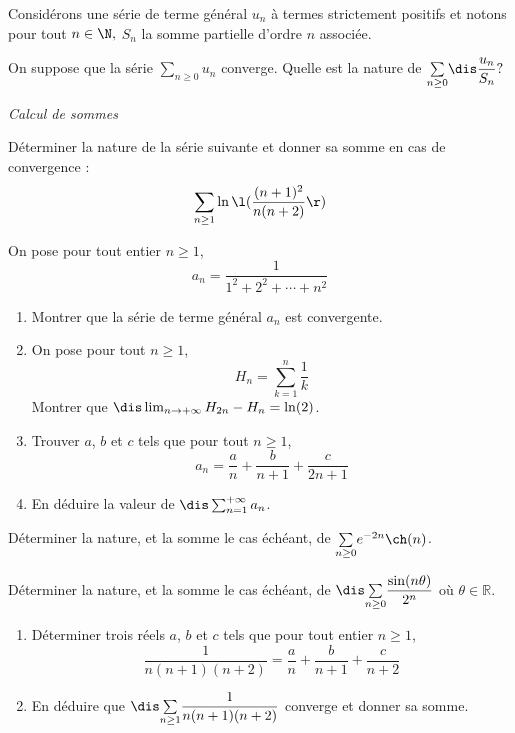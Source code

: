 \documentclass[a4paper,10pt]{report}
\newcommand{\Sum}[2]{\ensuremath{\textstyle{\sum\limits_{#1}^{#2}}}}
\begin{document}
\begin{Exa} Considérons une série de terme général $u_n$ à termes strictement positifs et notons pour tout $n\in\N,$ $S_n$ la somme partielle d'ordre $n$ associée. 

On suppose que la s\'erie $\Sum{n \geq 0}{} u_n$ converge. Quelle est la nature de $\Sum{n \geq 0}{} \dis \dfrac{u_n}{S_n}?$
\end{Exa}



\medskip

\begin{center}
\textit{{ {\large Calcul de sommes}}}
\end{center}

\medskip

\begin{Exa} Déterminer la nature de la série suivante et donner sa somme en cas de convergence : 
$$ \sum_{n \geq 1} \ln \l( \frac{(n+1)^2}{n(n+2)}\r)$$
\end{Exa}

\begin{Exa} On pose pour tout entier $n \geq 1$,
$$ a_n = \dfrac{1}{1^2+2^2 + \cdots + n^2}$$
\begin{enumerate}
\item Montrer que la série de terme général $a_n$ est convergente.
\item On pose pour tout $n \geq 1$,
$$ H_n = \sum_{k=1}^n \dfrac{1}{k}$$
Montrer que $\dis \lim_{n \rightarrow + \infty} H_{2n}-H_n = \ln(2)$.
\item Trouver $a$, $b$ et $c$ tels que pour tout $n \geq 1$,
$$ a_n = \dfrac{a}{n} + \dfrac{b}{n+1} + \dfrac{c}{2n+1}$$
\item En déduire la valeur de $\dis \sum_{n=1}^{+ \infty} a_n$.
\end{enumerate}
\end{Exa}


\begin{Exa} Déterminer la nature, et la somme le cas échéant, de $\Sum{n \geq 0}{} e^{-2n} \ch(n)$.
\end{Exa}

\begin{Exa} Déterminer la nature, et la somme le cas échéant, de $\dis \Sum{n \geq 0}{} \dfrac{\sin(n \theta)}{2^n}$ où $\theta \in \mathbb{R}$.
\end{Exa}


\begin{Exa} 
\begin{enumerate}
\item Déterminer trois réels $a$, $b$ et $c$ tels que pour tout entier $n \geq 1$,
$$ \frac{1}{n(n+1)(n+2)} = \frac{a}{n} + \frac{b}{n+1} + \frac{c}{n+2}$$
\item En déduire que $\dis \Sum{n \geq 1}{} \dfrac{1}{n(n+1)(n+2)}$ converge et donner sa somme.
\end{enumerate}
\end{Exa}
\end{document}
